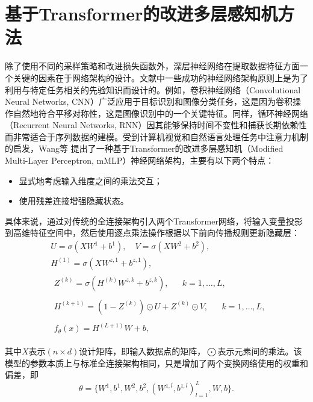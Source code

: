 \section{基于Transformer的改进多层感知机方法}

除了使用不同的采样策略和改进损失函数外，深层神经网络在提取数据特征方面一个关键的因素在于网络架构的设计。文献中一些成功的神经网络架构原则上是为了利用与特定任务相关的先验知识而设计的。例如，卷积神经网络（Convolutional Neural Networks, CNN）\cite{krizhevsky2012imagenet}广泛应用于目标识别和图像分类任务，这是因为卷积操作自然地符合平移对称性，这是图像识别中的一个关键特征。同样，循环神经网络（Recurrent Neural Networks, RNN）\cite{lipton2015critical}因其能够保持时间不变性和捕获长期依赖性而非常适合于序列数据的建模。受到计算机视觉和自然语言处理任务中注意力机制 \cite{vaswani2017attention}的启发，Wang等 \cite{wang2021understanding}提出了一种基于Transformer的改进多层感知机（Modified Multi-Layer Perceptron, mMLP）神经网络架构，主要有以下两个特点：
\begin{itemize}
    \item 显式地考虑输入维度之间的乘法交互；
    \item 使用残差连接增强隐藏状态。
\end{itemize}
具体来说，通过对传统的全连接架构引入两个Transformer网络，将输入变量投影到高维特征空间中，然后使用逐点乘法操作根据以下前向传播规则更新隐藏层：
\begin{equation}
    \begin{aligned}
        &U=\sigma (XW^{1}+b^{1}),\quad V=\sigma (XW^{2}+b^{2}), \\
        &H^{(1)}=\sigma (XW^{z,1}+b^{z,1}), \\
        &\begin{aligned}Z^{(k)}=\sigma (H^{(k)}W^{z,k}+b^{z,k}),&&k=1,\ldots,L,\end{aligned} \\
        &\begin{aligned}H^{(k+1)}=(1-Z^{(k)})\odot U+Z^{(k)}\odot V,&&k=1,\dots,L,\end{aligned} \\
        &\begin{aligned}f_\theta(x)=H^{(L+1)}W+b,\end{aligned}
    \end{aligned}
\end{equation}

其中$X$表示$(n × d)$设计矩阵，即输入数据点的矩阵，$\bigodot $表示元素间的乘法。该模型的参数本质上与标准全连接架构相同，只是增加了两个变换网络使用的权重和偏差，即
\begin{equation}\theta=\{W^1,b^1,W^2,b^2,(W^{z,l},b^{z,l})_{l=1}^L,W,b\}.\end{equation}


